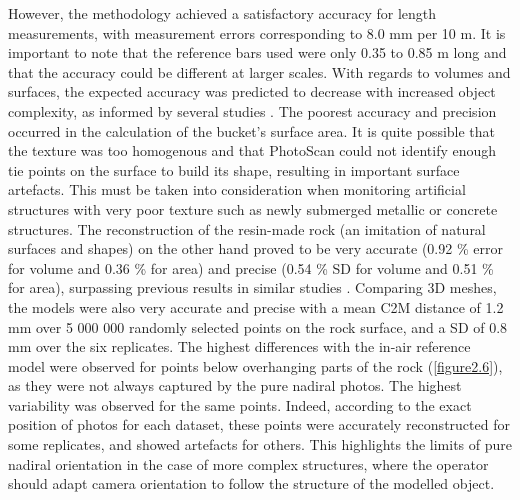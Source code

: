 However, the methodology achieved a satisfactory accuracy for length measurements, with measurement errors corresponding to 8.0 mm per 10 m. It is important to note that the reference bars used were only 0.35 to 0.85 m long and that the accuracy could be different at larger scales. With regards to volumes and surfaces, the expected accuracy was predicted to decrease with increased object complexity, as informed by several studies \citep{figueira_accuracy_2015, bryson_characterization_2017}. The poorest accuracy and precision occurred in the calculation of the bucket’s surface area. It is quite possible that the texture was too homogenous and that PhotoScan could not identify enough tie points on the surface to build its shape, resulting in important surface artefacts. This must be taken into consideration when monitoring artificial structures with very poor texture such as newly submerged metallic or concrete structures. The reconstruction of the resin-made rock (an imitation of natural surfaces and shapes) on the other hand proved to be very accurate (0.92 \% error for volume and 0.36 \% for area) and precise (0.54 \% SD for volume and 0.51 \% for area), surpassing previous results in similar studies \citep{figueira_accuracy_2015, bythell_three-dimensional_2001, courtney_estimating_2007, gutierrez-heredia_end_2016, lavy_quick_2015, shortis_calibration_2015}. Comparing 3D meshes, the models were also very accurate and precise with a mean C2M distance of 1.2 mm over 5 000 000 randomly selected points on the rock surface, and a SD of 0.8 mm over the six replicates. The highest differences with the in-air reference model were observed for points below overhanging parts of the rock (\autoref{figure2.6}), as they were not always captured by the pure nadiral photos. The highest variability was observed for the same points. Indeed, according to the exact position of photos for each dataset, these points were accurately reconstructed for some replicates, and showed artefacts for others. This highlights the limits of pure nadiral orientation in the case of more complex structures, where the operator should adapt camera orientation to follow the structure of the modelled object.

